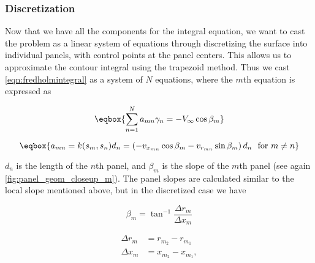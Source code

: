 \subsubsection{Discretization}
\label{sssec:vortexcoefficients}

Now that we have all the components for the integral equation, we want to cast the problem as a linear system of equations through discretizing the surface into individual panels, with control points at the panel centers.
This allows us to approximate the contour integral using the trapezoid method.
Thus we cast \cref{eqn:fredholmintegral} as a system of \(N\) equations, where the \(m\)th equation is expressed as

\begin{equation}
	\label{eqn:eqn_m}
	\eqbox{
	\sum_{n=1}^N a_{mn} \gamma_n = -V_\infty \cos \beta_m
}
\end{equation}

\where{}

\begin{equation}
	\label{eqn:vringamn}
	\eqbox{
		a_{mn} = k(s_m,s_n)d_n = \left( -v_{x_{mn}} \cos \beta_m - v_{r_{mn}}\sin \beta_m \right) d_n ~~\text{for}~m\neq n
	}
\end{equation}

\where \(d_n\) is the length of the \(n\)th panel, and \(\beta_m\) is the slope of the \(m\)th panel (see again \cref{fig:panel_geom_closeup_m}).
The panel slopes are calculated similar to the local slope mentioned above, but in the discretized case we have


\begin{equation}
	\beta_m = \tan^{-1}\frac{\Delta {r}_m}{\Delta {x}_m}
\end{equation}

\where

\begin{equation}
	\begin{aligned}
		\Delta {r}_m &= r_{m_2} - r_{m_1} \\
		\Delta {x}_m &= x_{m_2} - x_{m_1},
	\end{aligned}
\end{equation}

